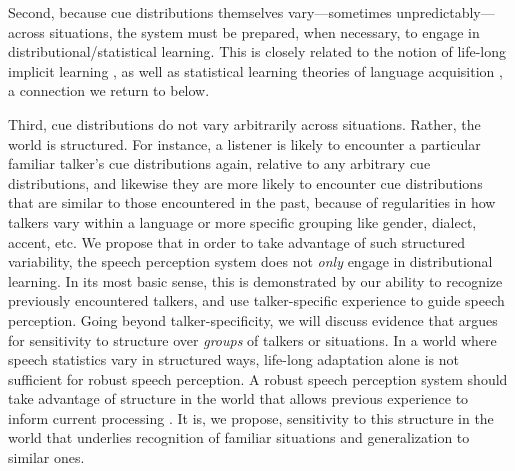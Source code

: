 Second, because cue distributions themselves vary---sometimes un\-pre\-dictably---across situations, the system must be prepared, when necessary, to engage in distributional/statistical learning.  This is closely related to the notion of life-long implicit learning \autocite{Botvinick2004,Elman1990,Chang2006}, as well as statistical learning theories of language acquisition \autocite{Feldman2013a,McMurray2009,Vallabha2007}, a connection we return to below.

Third, cue distributions do not vary arbitrarily across situations.  Rather, the world is structured.  For instance, a listener is likely to encounter a particular familiar talker's cue distributions again, relative to any arbitrary cue distributions, and likewise they are more likely to encounter cue distributions that are similar to those encountered in the past, because of regularities in how talkers vary within a language or more specific grouping like gender, dialect, accent, etc.  We propose that in order to take advantage of such structured variability, the speech perception system does not \emph{only} engage in distributional learning. In its most basic sense, this is demonstrated
by our ability to recognize previously encountered talkers, and use talker-specific experience to guide speech perception. 
Going beyond talker-specificity, we will discuss evidence that argues for sensitivity to structure over
\emph{groups} of talkers or situations. In a world where speech statistics vary in structured ways, life-long adaptation alone is not sufficient for robust speech perception. A robust speech perception system should take advantage of structure in the world that allows previous experience to inform current processing \autocite[for similar reasoning applied
to other cognitive domains, cf.][]{Qian2012}. It is, we propose, sensitivity to this structure in the world that underlies recognition of familiar situations and generalization to similar ones.

